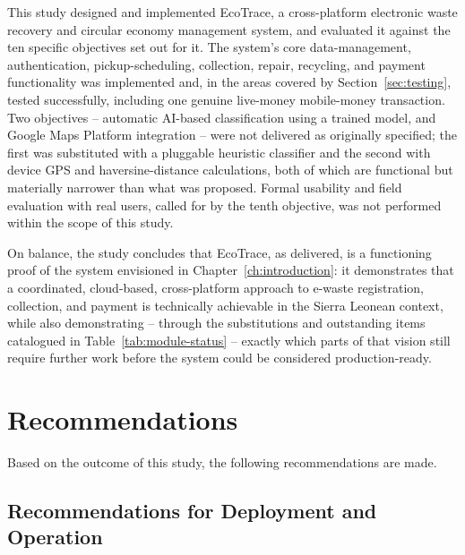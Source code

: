 This study designed and implemented EcoTrace, a cross-platform electronic
waste recovery and circular economy management system, and evaluated it
against the ten specific objectives set out for it. The system's core
data-management, authentication, pickup-scheduling, collection, repair,
recycling, and payment functionality was implemented and, in the areas
covered by Section~\ref{sec:testing}, tested successfully, including one
genuine live-money mobile-money transaction. Two objectives -- automatic
AI-based classification using a trained model, and Google Maps Platform
integration -- were not delivered as originally specified; the first was
substituted with a pluggable heuristic classifier and the second with
device GPS and haversine-distance calculations, both of which are
functional but materially narrower than what was proposed. Formal usability
and field evaluation with real users, called for by the tenth objective,
was not performed within the scope of this study.

On balance, the study concludes that EcoTrace, as delivered, is a
functioning proof of the system envisioned in Chapter~\ref{ch:introduction}:
it demonstrates that a coordinated, cloud-based, cross-platform approach to
e-waste registration, collection, and payment is technically achievable in
the Sierra Leonean context, while also demonstrating -- through the
substitutions and outstanding items catalogued in
Table~\ref{tab:module-status} -- exactly which parts of that vision still
require further work before the system could be considered
production-ready.

\section{Recommendations}

Based on the outcome of this study, the following recommendations are made.

\subsection{Recommendations for Deployment and Operation}

